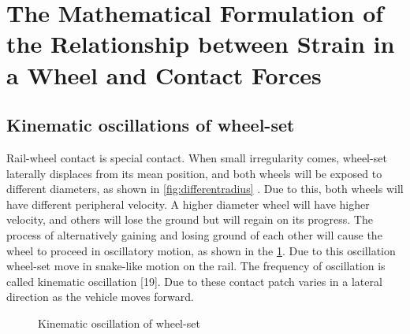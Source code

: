 \documentclass[]{interact}
\theoremstyle{plain}%
\theoremstyle{definition}
\theoremstyle{remark}
\begin{document}
\section{The Mathematical Formulation of the Relationship between Strain in a Wheel and Contact Forces}
\subsection{Kinematic oscillations of wheel-set}
Rail-wheel contact is special contact. When small irregularity comes, wheel-set laterally displaces from its mean position, and both wheels will be exposed to different diameters, as shown in \cref{fig:differentradius} . Due to this, both wheels will have different peripheral velocity. A higher diameter wheel will have higher velocity, and others will lose the ground but will regain on its progress. The process of alternatively gaining and losing ground of each other will cause the wheel to proceed in oscillatory motion, as shown in the \cref{fig:kinematicoscillation}. Due to this oscillation wheel-set move in snake-like motion on the rail. The frequency of oscillation is called kinematic oscillation [19]. Due to these contact patch varies in a lateral direction as the vehicle moves forward.


\begin{figure}
\centering

\caption{Kinematic oscillation of wheel-set}
\label{fig:kinematicoscillation}
\end{figure}
\end{document}
